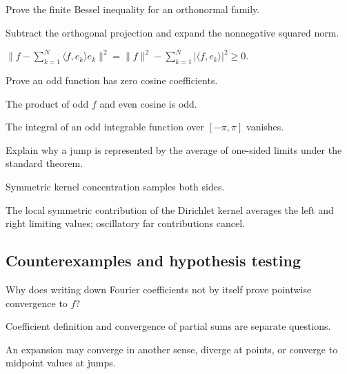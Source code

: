 \begin{exercise}\label{exr:ii14-expand-07}
Prove the finite Bessel inequality for an orthonormal family.
\end{exercise}
\begin{hint}
Subtract the orthogonal projection and expand the nonnegative squared norm.
\end{hint}
\begin{solution}
\(\|f-\sum_{k=1}^N\langle f,e_k\rangle e_k\|^2=\|f\|^2-\sum_{k=1}^N|\langle f,e_k\rangle|^2\ge0\).
\end{solution}

\begin{exercise}\label{exr:ii14-expand-08}
Prove an odd function has zero cosine coefficients.
\end{exercise}
\begin{hint}
The product of odd \(f\) and even cosine is odd.
\end{hint}
\begin{solution}
The integral of an odd integrable function over \([-\pi,\pi]\) vanishes.
\end{solution}

\begin{exercise}\label{exr:ii14-expand-09}
Explain why a jump is represented by the average of one-sided limits under the standard theorem.
\end{exercise}
\begin{hint}
Symmetric kernel concentration samples both sides.
\end{hint}
\begin{solution}
The local symmetric contribution of the Dirichlet kernel averages the left and right limiting values; oscillatory far contributions cancel.
\end{solution}

\subsection*{Counterexamples and hypothesis testing}

\begin{exercise}\label{exr:ii14-expand-10}
Why does writing down Fourier coefficients not by itself prove pointwise convergence to \(f\)?
\end{exercise}
\begin{hint}
Coefficient definition and convergence of partial sums are separate questions.
\end{hint}
\begin{solution}
An expansion may converge in another sense, diverge at points, or converge to midpoint values at jumps.
\end{solution}

